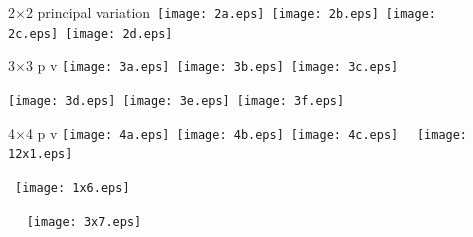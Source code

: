 \documentclass[12pt]{article}
\begin{document}

2$\times$2 principal variation\hfill\
\texttt{[image: 2a.eps]}\hfill\
\texttt{[image: 2b.eps]}\hfill\
\texttt{[image: 2c.eps]}\hfill\
\texttt{[image: 2d.eps]}\hfill~
\vfill

3$\times$3 p v\hfill
\texttt{[image: 3a.eps]}\hfill\
\texttt{[image: 3b.eps]}\hfill\
\texttt{[image: 3c.eps]}\hfill~
\vfill

\hfill
\texttt{[image: 3d.eps]}\hfill\
\texttt{[image: 3e.eps]}\hfill\
\texttt{[image: 3f.eps]}\hfill~
\vfill

4$\times$4 p v\hfill
\texttt{[image: 4a.eps]}\hfill\
\texttt{[image: 4b.eps]}\hfill\
\texttt{[image: 4c.eps]}\hfill~
\newpage
~\vfill\texttt{[image: 12x1.eps]}\vfill~

\vspace*{-20cm}~\hfill\texttt{[image: 1x6.eps]}

\vspace*{10cm}~ ~\hfill\texttt{[image: 3x7.eps]}
\end{document}
